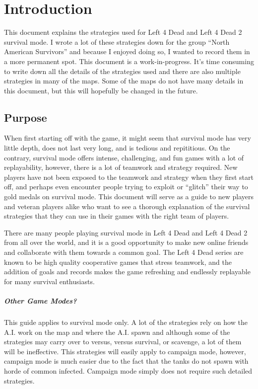 \chapter{Introduction}
This document explains the strategies used for Left 4 Dead and Left 4 Dead 2 survival mode. I wrote a lot of these strategies down for the group ``North American Survivors'' and because I enjoyed doing so, I wanted to record them in a more permanent spot. This document is a work-in-progress. It's time consuming to write down all the details of the strategies used and there are also multiple strategies in many of the maps. Some of the maps do not have many details in this document, but this will hopefully be changed in the future.

\section{Purpose}
When first starting off with the game, it might seem that survival mode has very little depth, does not last very long, and is tedious and repititious. On the contrary, survival mode offers intense, challenging, and fun games with a lot of replayability, however, there is a lot of teamwork and strategy required. New players have not been exposed to the teamwork and strategy when they first start off, and perhaps even encounter people trying to exploit or ``glitch'' their way to gold medals on survival mode. This document will serve as a guide to new players and veteran players alike who want to see a thorough explanation of the survival strategies that they can use in their games with the right team of players.

There are many people playing survival mode in Left 4 Dead and Left 4 Dead 2 from all over the world, and it is a good opportunity to make new online friends and collaborate with them towards a common goal. The Left 4 Dead series are known to be high quality cooperative games that stress teamwork, and the addition of goals and records makes the game refreshing and endlessly replayable for many survival enthusiasts.

\paragraph{Other Game Modes?}
This guide applies to survival mode only. A lot of the strategies rely on how the A.I. work on the map and where the A.I. spawn and although some of the strategies may carry over to versus, versus survival, or scavenge, a lot of them will be ineffective. This strategies will easily apply to campaign mode, however, campaign mode is much easier due to the fact that the tanks do not spawn with horde of common infected. Campaign mode simply does not require such detailed strategies.

